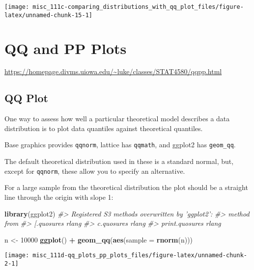 \documentclass[]{book}
\newenvironment{Shaded}{\begin{snugshade}}{\end{snugshade}}
\newcommand{\CommentTok}[1]{\textcolor[rgb]{0.56,0.35,0.01}{\textit{#1}}}
\newcommand{\DataTypeTok}[1]{\textcolor[rgb]{0.13,0.29,0.53}{#1}}
\newcommand{\DecValTok}[1]{\textcolor[rgb]{0.00,0.00,0.81}{#1}}
\newcommand{\KeywordTok}[1]{\textcolor[rgb]{0.13,0.29,0.53}{\textbf{#1}}}
\newcommand{\NormalTok}[1]{#1}
\newcommand{\OperatorTok}[1]{\textcolor[rgb]{0.81,0.36,0.00}{\textbf{#1}}}
\newcommand{\StringTok}[1]{\textcolor[rgb]{0.31,0.60,0.02}{#1}}
\begin{document}
\begin{center}\texttt{[image: misc\_111c-comparing\_distributions\_with\_qq\_plot\_files/figure-latex/unnamed-chunk-15-1]} \end{center}

\hypertarget{qq-and-pp-plots}{%
\chapter{QQ and PP Plots}\label{qq-and-pp-plots}}

\url{https://homepage.divms.uiowa.edu/~luke/classes/STAT4580/qqpp.html}

\hypertarget{qq-plot}{%
\section{QQ Plot}\label{qq-plot}}

One way to assess how well a particular theoretical model describes a data distribution is to plot data quantiles against theoretical quantiles.

Base graphics provides \texttt{qqnorm}, lattice has \texttt{qqmath}, and ggplot2 has \texttt{geom\_qq}.

The default theoretical distribution used in these is a standard normal, but, except for \texttt{qqnorm}, these allow you to specify an alternative.

For a large sample from the theoretical distribution the plot should be a straight line through the origin with slope 1:

\begin{Shaded}
\begin{Highlighting}[]
\KeywordTok{library}\NormalTok{(ggplot2)}
\CommentTok{#> Registered S3 methods overwritten by 'ggplot2':}
\CommentTok{#>   method         from }
\CommentTok{#>   [.quosures     rlang}
\CommentTok{#>   c.quosures     rlang}
\CommentTok{#>   print.quosures rlang}

\NormalTok{n <-}\StringTok{ }\DecValTok{10000}
\KeywordTok{ggplot}\NormalTok{() }\OperatorTok{+}\StringTok{ }\KeywordTok{geom_qq}\NormalTok{(}\KeywordTok{aes}\NormalTok{(}\DataTypeTok{sample =} \KeywordTok{rnorm}\NormalTok{(n)))}
\end{Highlighting}
\end{Shaded}

\begin{center}\texttt{[image: misc\_111d-qq\_plots\_pp\_plots\_files/figure-latex/unnamed-chunk-2-1]} \end{center}
\end{document}
